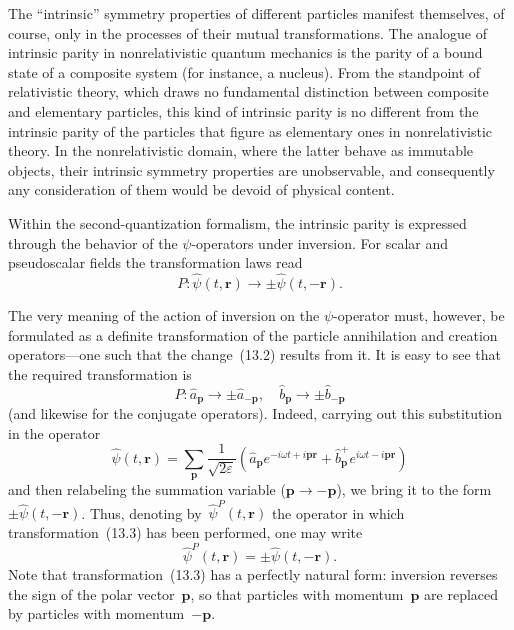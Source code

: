 The ``intrinsic'' symmetry properties of different particles manifest themselves, of course, only in the processes of their mutual transformations. The analogue of intrinsic parity in nonrelativistic quantum mechanics is the parity of a bound state of a composite system (for instance, a nucleus). From the standpoint of relativistic theory, which draws no fundamental distinction between composite and elementary particles, this kind of intrinsic parity is no different from the intrinsic parity of the particles that figure as
elementary ones in nonrelativistic theory. In the nonrelativistic domain, where the latter behave as immutable objects, their intrinsic symmetry properties are unobservable, and consequently any consideration of them would be devoid of physical content.

Within the second-quantization formalism, the intrinsic parity is expressed through the behavior of the $\psi$-operators under inversion. For scalar and pseudoscalar fields the transformation laws read
\begin{equation}
P:\hat{\psi}(t,\mathbf{r}) \to \pm\hat{\psi}(t,-\mathbf{r}).
\tag{13.2}
\end{equation}

The very meaning of the action of inversion on the $\psi$-operator must, however, be formulated as a definite transformation of the particle annihilation and creation operators---one such that the change~(13.2) results from it. It is easy to see that the required transformation is
\begin{equation}
P:\hat{a}_\mathbf{p} \to \pm\hat{a}_{-\mathbf{p}}, \quad \hat{b}_\mathbf{p} \to \pm\hat{b}_{-\mathbf{p}}
\tag{13.3}
\end{equation}
(and likewise for the conjugate operators). Indeed, carrying out this substitution in the operator
\begin{equation}
\hat{\psi}(t,\mathbf{r}) = \sum_\mathbf{p} \frac{1}{\sqrt{2\varepsilon}} \left(\hat{a}_\mathbf{p} e^{-i\omega t + i\mathbf{pr}} + \hat{b}^+_\mathbf{p} e^{i\omega t - i\mathbf{pr}}\right)
\tag{13.4}
\end{equation}
and then relabeling the summation variable ($\mathbf{p} \to -\mathbf{p}$), we bring it to the form~$\pm\hat{\psi}(t,-\mathbf{r})$. Thus, denoting by~$\hat{\psi}^P(t,\mathbf{r})$ the operator in which transformation~(13.3) has been performed, one may write
\begin{equation}
\hat{\psi}^P(t,\mathbf{r}) = \pm\hat{\psi}(t,-\mathbf{r}).
\tag{13.5}
\end{equation}
Note that transformation~(13.3) has a perfectly natural form: inversion reverses the sign of the polar vector~$\mathbf{p}$, so that particles with momentum~$\mathbf{p}$ are replaced by particles with momentum~$-\mathbf{p}$.


